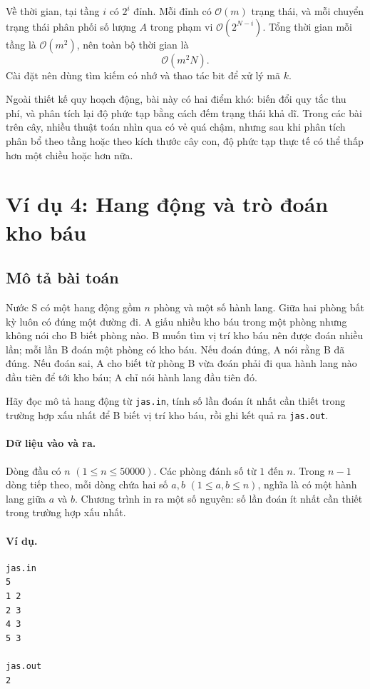 \documentclass[11pt]{article}
\newcommand{\Oh}{\mathcal{O}}
\begin{document}
Về thời gian, tại tầng \(i\) có \(2^i\) đỉnh. Mỗi đỉnh có \(\Oh(m)\) trạng
thái, và mỗi chuyển trạng thái phân phối số lượng \(A\) trong phạm vi
\(\Oh(2^{N-i})\). Tổng thời gian mỗi tầng là \(\Oh(m^2)\), nên toàn bộ thời
gian là
\[
  \Oh(m^2N).
\]
Cài đặt nên dùng tìm kiếm có nhớ và thao tác bit để xử lý mã \(k\).

Ngoài thiết kế quy hoạch động, bài này có hai điểm khó: biến đổi quy tắc thu
phí, và phân tích lại độ phức tạp bằng cách đếm trạng thái khả dĩ. Trong các
bài trên cây, nhiều thuật toán nhìn qua có vẻ quá chậm, nhưng sau khi phân
tích phân bổ theo tầng hoặc theo kích thước cây con, độ phức tạp thực tế có
thể thấp hơn một chiều hoặc hơn nữa.

\section{Ví dụ 4: Hang động và trò đoán kho báu}

\subsection{Mô tả bài toán}

Nước S có một hang động gồm \(n\) phòng và một số hành lang. Giữa hai phòng
bất kỳ luôn có đúng một đường đi. A giấu nhiều kho báu trong một phòng nhưng
không nói cho B biết phòng nào. B muốn tìm vị trí kho báu nên được đoán nhiều
lần; mỗi lần B đoán một phòng có kho báu. Nếu đoán đúng, A nói rằng B đã
đúng. Nếu đoán sai, A cho biết từ phòng B vừa đoán phải đi qua hành lang nào
đầu tiên để tới kho báu; A chỉ nói hành lang đầu tiên đó.

Hãy đọc mô tả hang động từ \texttt{jas.in}, tính số lần đoán ít nhất cần thiết
trong trường hợp xấu nhất để B biết vị trí kho báu, rồi ghi kết quả ra
\texttt{jas.out}.

\paragraph{Dữ liệu vào và ra.}
Dòng đầu có \(n\) \((1\le n\le 50000)\). Các phòng đánh số từ \(1\) đến
\(n\). Trong \(n-1\) dòng tiếp theo, mỗi dòng chứa hai số \(a,b\)
\((1\le a,b\le n)\), nghĩa là có một hành lang giữa \(a\) và \(b\). Chương
trình in ra một số nguyên: số lần đoán ít nhất cần thiết trong trường hợp xấu
nhất.

\paragraph{Ví dụ.}
\begin{verbatim}
jas.in
5
1 2
2 3
4 3
5 3

jas.out
2
\end{verbatim}
\end{document}
